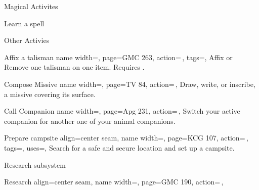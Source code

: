 \begin{PageFront}
\begin{Tables}{\frontTableHeight}
\begin{Table}{Magical Activites}
\begin{entry}{Learn a spell}
            \end{entry}
        \end{Table}
        \TableSpace
        \begin{Table}{Other Activies}
            \begin{entry}{Affix a talisman}{%
                name width=\activityLength,%
                page=GMC 263,
                action=\,,
                tags=\Manipulate,
            }
                Affix or Remove one talisman on one item. Requires .\hfill {}
            \end{entry}
            \begin{entry}{Compose Missive}{%
                name width=\activityLength,%
                page=TV 84,
                action=\,,
            }
                Draw, write, or inscribe, a missive covering its surface.\hfill
            \end{entry}
            \begin{entry}{Call Companion}{%
                name width=\activityLength,%
                page=Apg 231,
                action=\,,
            }
                Switch your active companion for another one of your animal companions.
            \end{entry}
            \begin{entry}{Prepare campsite}{%
                align=center seam,
                name width=\activityLength,%
                page=KCG 107,
                action=\,,
                tags=\Concentrate\Move,
                uses=\Survival,
            }
                Search for a safe and secure location and set up a campsite.\hfill{}\\
                \hfill{}\hfill {}
            \end{entry}
        \end{Table}
        \TableSpace
        \begin{Table}{Research subsystem}
            \begin{entry}{Research}{%
                align=center seam,
                name width=\activityLength,%
                page=GMC 190,
                action=\,,
}
\end{entry}
\end{Table}
\end{Tables}
\end{PageFront}

